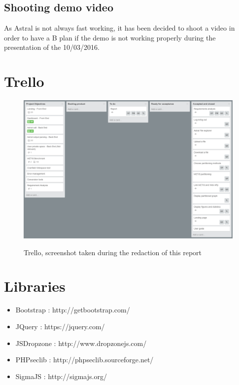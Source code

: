 \documentclass{cranfieldChart}
\begin{document}
\subsection*{Shooting demo video}
As Astral is not always fast working, it has been decided to shoot a video in order to have a B plan if the demo is not working properly during the presentation of the 10/03/2016.

\newpage
\section{Trello}

\begin{figure}[h!]
\centering
\includegraphics[width=1\textwidth]{ressources/trello}
\label{trello}
\caption{Trello, screenshot taken during the redaction of this report}
\end{figure}

\newpage

\section{Libraries}
\begin{itemize}
\item Bootstrap : http://getbootstrap.com/
\item JQuery : https://jquery.com/
\item JSDropzone : http://www.dropzonejs.com/
\item PHPseclib : http://phpseclib.sourceforge.net/
\item SigmaJS : http://sigmajs.org/
\end{itemize}
\end{document}

